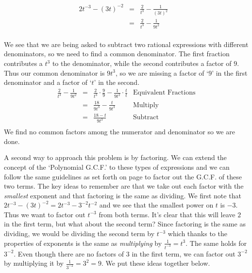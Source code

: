 \documentclass{ximera}
\begin{document}
\begin{example}
\begin{explanation}
\begin{enumerate}
\[\begin{array}{rclr}
 2t^{-3} - (3t)^{-2} & = & \frac{2}{t^3} - \frac{1}{(3t)^2} & \\  
                     & = & \frac{2}{t^3} - \frac{1}{9t^2} & \\ \end{array}\]
										
We see that we are being asked to subtract two rational expressions with different denominators, so we need to find a common denominator.  The first fraction contributes a $t^3$ to the denominator, while the second contributes a factor of $9$.  Thus our common denominator is $9t^3$, so we are missing a factor of `$9$' in the first denominator and a factor of `$t$' in the second. \[ \begin{array}{rclr}

 \frac{2}{t^3} - \frac{1}{9t^2} & = &  \frac{2}{t^3} \cdot \frac{9}{9} - \frac{1}{9t^2} \cdot \frac{t}{t} & \text{Equivalent Fractions} \\  

                                  & = &  \frac{18}{9t^3} - \frac{t}{9t^3} & \text{Multiply}\\  
																	
																	& = & \frac{18 - t}{9t^3} & \text{Subtract} \\ \end{array}\]
We find no common factors among the numerator and denominator so we are done.  

A second way to approach this problem is by factoring.  We can extend the concept of the `Polynomial G.C.F.' to these types of expressions and we can follow the same guidelines as set forth on page \pageref{PolynomialGCF} to factor out the G.C.F. of these two terms.  The key ideas to remember are that we take out each factor with the \textit{smallest} exponent and that factoring is the same as dividing.  We first note that $2t^{-3} - (3t)^{-2}=  2t^{-3} - 3^{-2} t^{-2}$ and we see that the smallest power on $t$ is $-3$. Thus we want to factor out $t^{-3}$ from both terms.  It's clear that this will leave $2$ in the first term, but what about the second term?  Since factoring is the same as dividing, we would be dividing the second term by $t^{-3}$ which thanks to the properties of exponents is the same as \textit{multiplying} by $\frac{1}{t^{-3}} = t^3$.  The same holds for $3^{-2}$.  Even though there are no factors of $3$ in the first term, we can factor out $3^{-2}$ by multiplying it by $\frac{1}{3^{-2}} = 3^2 = 9$. We put these ideas together below.\[ \begin{array}{rclr}


\end{array}\]
\end{enumerate}
\end{explanation}
\end{example}
\end{document}
